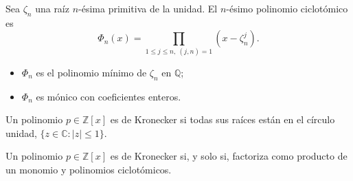 \documentclass[10pt,compress]{beamer}
\begin{document}

\begin{frame}
  \begin{definition}
    Sea $\zeta_n$ una raíz $n$-ésima primitiva de la unidad. El $n$-ésimo polinomio ciclotómico es
    \[ \Phi_n(x)=\prod_{1\le j\le n,~(j,n)=1}(x-\zeta_n^j). \]
  \end{definition}
  
  \begin{itemize}
  \item $\Phi_n$ es el polinomio mínimo de $\zeta_n$ en $\mathbb{Q}$;
  \item $\Phi_n$ es mónico con coeficientes enteros.
  \end{itemize}

  \begin{definition}
    Un polinomio $p \in \mathbb{Z}[x]$ es de Kronecker si todas sus raíces están en el círculo
    unidad, $\{z \in \mathbb{C} : |z| \le 1\}$.
  \end{definition}
  
  \begin{lemma}[Kronecker]
    Un polinomio $p \in \mathbb{Z}[x]$ es de Kronecker si, y solo si, factoriza como producto de un
    monomio y polinomios ciclotómicos.
  \end{lemma}  
\end{frame}
\end{document}
